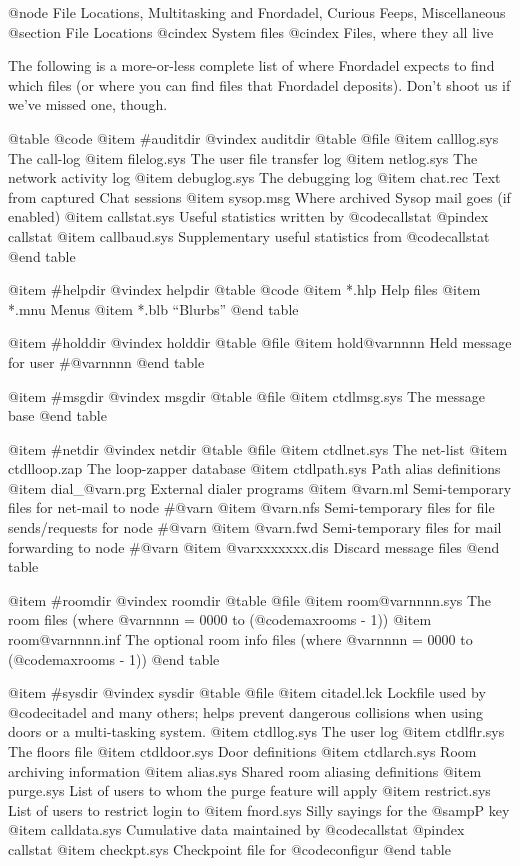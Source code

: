 {{{@node File Locations, Multitasking and Fnordadel, Curious Feeps, Miscellaneous
@section File Locations
@cindex System files
@cindex Files, where they all live

The following is a more-or-less complete list of where Fnordadel
expects to find which files (or where you can find files that Fnordadel
deposits).  Don't shoot us if we've missed one, though.

@table @code
@item #auditdir
@vindex auditdir
@table @file
@item calllog.sys
The call-log
@item filelog.sys
The user file transfer log
@item netlog.sys
The network activity log
@item debuglog.sys
The debugging log
@item chat.rec
Text from captured Chat sessions
@item sysop.msg
Where archived Sysop mail goes (if enabled)
@item callstat.sys
Useful statistics written by @code{callstat}
@pindex callstat
@item callbaud.sys
Supplementary useful statistics from @code{callstat}
@end table

@item #helpdir
@vindex helpdir
@table @code
@item *.hlp
Help files
@item *.mnu
Menus
@item *.blb
``Blurbs''
@end table

@item #holddir
@vindex holddir
@table @file
@item hold@var{nnnn}
Held message for user #@var{nnnn}
@end table

@item #msgdir
@vindex msgdir
@table @file
@item ctdlmsg.sys
The message base
@end table

@item #netdir
@vindex netdir
@table @file
@item ctdlnet.sys
The net-list
@item ctdlloop.zap
The loop-zapper database
@item ctdlpath.sys
Path alias definitions
@item dial_@var{n}.prg
External dialer programs
@item @var{n}.ml
Semi-temporary files for net-mail to node #@var{n}
@item @var{n}.nfs
Semi-temporary files for file sends/requests for node #@var{n}
@item @var{n}.fwd
Semi-temporary files for mail forwarding to node #@var{n}
@item @var{xxxxxxx}.dis
Discard message files
@end table

@item #roomdir
@vindex roomdir
@table @file
@item room@var{nnnn}.sys
The room files (where @var{nnnn} = 0000 to (@code{maxrooms} - 1))
@item room@var{nnnn}.inf
The optional room info files (where @var{nnnn} = 0000 to (@code{maxrooms} - 1))
@end table

@item #sysdir
@vindex sysdir
@table @file
@item citadel.lck
Lockfile used by @code{citadel} and many others; helps
prevent dangerous collisions when using doors or a
multi-tasking system.
@item ctdllog.sys
The user log
@item ctdlflr.sys
The floors file
@item ctdldoor.sys
Door definitions
@item ctdlarch.sys
Room archiving information
@item alias.sys
Shared room aliasing definitions
@item purge.sys
List of users to whom the purge feature will apply
@item restrict.sys
List of users to restrict login to
@item fnord.sys
Silly sayings for the @samp{P} key
@item calldata.sys
Cumulative data maintained by @code{callstat}
@pindex callstat
@item checkpt.sys
Checkpoint file for @code{configur}
@end table

}}}
